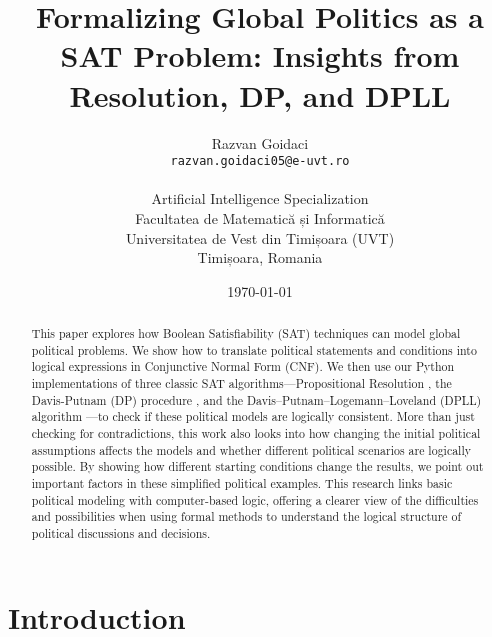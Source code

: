 \documentclass[11pt, a4paper]{article}
\title{Formalizing Global Politics as a SAT Problem: Insights from Resolution, DP, and DPLL}
\author{
    Razvan Goidaci \\
    \texttt{razvan.goidaci05@e-uvt.ro} \\ \\
    Artificial Intelligence Specialization \\
    Facultatea de Matematică și Informatică \\
    Universitatea de Vest din Timișoara (UVT) \\
    Timișoara, Romania
}
\date{\today}
\begin{document}
\maketitle

\begin{abstract}
This paper explores how Boolean Satisfiability (SAT) techniques can model global political problems. We show how to translate political statements and conditions into logical expressions in Conjunctive Normal Form (CNF). We then use our Python implementations of three classic SAT algorithms—Propositional Resolution \cite{Robinson1965}, the Davis-Putnam (DP) procedure \cite{DavisPutnam1960}, and the Davis–Putnam–Logemann–Loveland (DPLL) algorithm \cite{DPLL1962}—to check if these political models are logically consistent. More than just checking for contradictions, this work also looks into how changing the initial political assumptions affects the models and whether different political scenarios are logically possible. By showing how different starting conditions change the results, we point out important factors in these simplified political examples. This research links basic political modeling with computer-based logic, offering a clearer view of the difficulties and possibilities when using formal methods to understand the logical structure of political discussions and decisions.
\end{abstract}

\section{Introduction}
\end{document}
